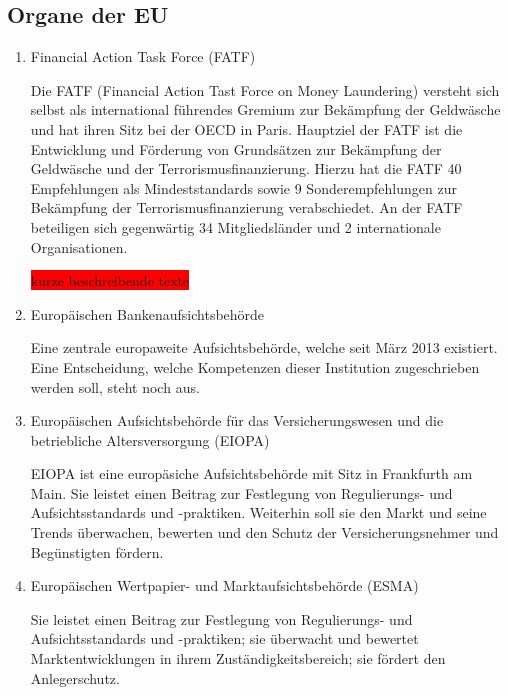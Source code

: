 \documentclass{article}
\begin{document}
        \subsection[Organe EU]{Organe der EU}

            \begin{enumerate}

                \item Financial Action Task Force (FATF)

                    Die FATF (Financial Action Tast Force on Money Laundering) versteht sich selbst als international führendes Gremium zur Bekämpfung der Geldwäsche und hat ihren Sitz bei der OECD in Paris. Hauptziel der FATF ist die Entwicklung und Förderung von Grundsätzen zur Bekämpfung der Geldwäsche und der Terrorismusfinanzierung. Hierzu hat die FATF 40 Empfehlungen als Mindeststandards sowie 9 Sonderempfehlungen zur Bekämpfung der Terrorismusfinanzierung verabschiedet. An der FATF beteiligen sich gegenwärtig 34 Mitgliedsländer und 2 internationale Organisationen.

                    \colorbox{red}{kurze beschreibende texte}

                \item Europäischen Bankenaufsichtsbehörde

                    Eine zentrale europaweite Aufsichtsbehörde, welche seit März 2013 existiert. Eine Entscheidung, welche Kompetenzen dieser Institution zugeschrieben werden soll, steht noch aus. \cite{EuBaAuf}

                \item Europäischen Aufsichtsbehörde für das Versicherungswesen und die betriebliche Altersversorgung (EIOPA)

                    EIOPA ist eine europäsiche Aufsichtsbehörde mit Sitz in Frankfurth am Main. Sie leistet einen Beitrag zur Festlegung von Regulierungs- und Aufsichtsstandards und -praktiken. Weiterhin soll sie den Markt und seine Trends überwachen, bewerten und den Schutz der Versicherungsnehmer und Begünstigten fördern. \cite{EuVeAu}


                \item Europäischen Wertpapier- und Marktaufsichtsbehörde (ESMA)

                    Sie leistet einen Beitrag zur Festlegung von Regulierungs- und Aufsichtsstandards und -praktiken; sie überwacht und bewertet Marktentwicklungen in ihrem Zuständigkeitsbereich; sie fördert den Anlegerschutz.


            \end{enumerate}        
\end{document}
